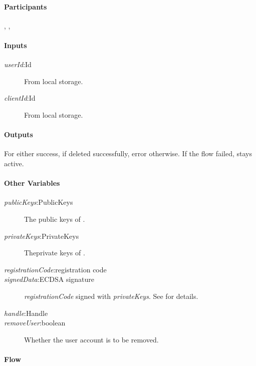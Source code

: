 \documentclass[a4paper,10pt]{article}
\newcommand{\signedData}{\emph{signedData}}
\newcommand{\handle}{\emph{handle}}
\newcommand{\registrationCode}{\emph{registrationCode}}
\newcommand{\privateKeys}{\emph{privateKeys}}
\newcommand{\publicKeys}{\emph{publicKeys}}
\newcommand{\userId}{\emph{userId}}
\newcommand{\clientId}{\emph{clientId}}
\newcommand{\removeUser}{\emph{removeUser}}
\begin{document}
\paragraph{Participants} \Client{}, \Server{}, \User{}

\paragraph{Inputs}
\SpecialItem
\begin{description}
 \item[\userId{}:Id] From \Client{} local storage.
 \item[\clientId{}:Id] From \Client{} local storage.
\end{description}

\paragraph{Outputs}
For \Client{} either success, if \Server{} deleted \Client{} successfully, 
error otherwise. If the flow failed, \Client{} stays active.

\paragraph{Other Variables}
\SpecialItem
\begin{description}
 \item[\publicKeys{}:PublicKeys] The public keys of  \Client{}. 
 \item[\privateKeys{}:PrivateKeys] Theprivate keys of \Client{}.
 \item[\registrationCode{}:registration code]
 \item[\signedData{}:ECDSA signature] \registrationCode{} signed with
\privateKeys{}. See \cite{crypto_spec} for details.
 \item[\handle{}:Handle]
 \item[\removeUser:boolean] Whether the user account is to be removed.
\end{description}

\paragraph{Flow}
\end{document}
